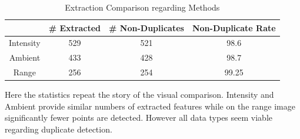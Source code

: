 {{    \begin{table}[!ht]
        \setlength{\extrarowheight}{10pt}
        \centering
        \large
        \begin{tabular}{cccc}
             & \# Extracted & \# Non-Duplicates & Non-Duplicate Rate\\[12pt]
            \hline
            Intensity & 529 & 521 & 98.6\\[12pt]
            \hline
            Ambient & 433 & 428 & 98.7\\[12pt]
            \hline
            Range & 256 & 254 & 99.25\\[12pt]
            \hline
        \end{tabular}
        \caption{Extraction Comparison regarding Methods}
        \label{tab:extraction_data}
    \end{table}

    Here the statistics repeat the story of the visual comparison. Intensity and Ambient provide similar numbers of extracted features while on the range image significantly fewer points are detected. However all data types seem viable regarding duplicate detection.

    }

}